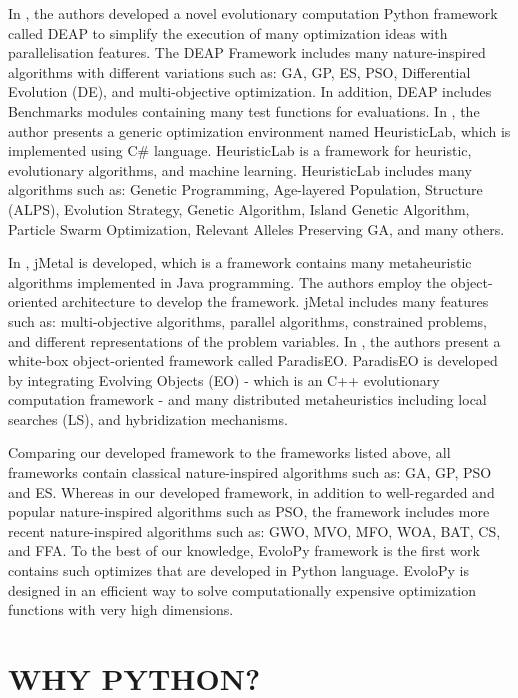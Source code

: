 \documentclass[a4paper,twoside]{article}
\begin{document}
In \cite {DEAP_JMLR2012}, the authors developed a novel evolutionary computation Python framework called DEAP to simplify the execution of many optimization ideas with  parallelisation features. The DEAP Framework includes many nature-inspired algorithms with different variations such as: GA, GP, ES, PSO, Differential Evolution (DE), and multi-objective optimization. In addition, DEAP includes Benchmarks modules containing many test functions for evaluations. In \cite{Wagner04}, the author presents a generic optimization environment named HeuristicLab, which is implemented using C\# language. HeuristicLab is a framework for heuristic, evolutionary algorithms, and machine learning. HeuristicLab includes many algorithms such as: Genetic Programming, Age-layered Population, Structure (ALPS), Evolution Strategy, Genetic Algorithm, Island Genetic Algorithm, Particle Swarm Optimization, Relevant Alleles Preserving GA, and many others. 

In \cite{Durillo2011}, jMetal is developed, which is a framework contains many metaheuristic algorithms implemented in Java programming. The authors employ the object-oriented architecture to develop the framework. jMetal includes many features such as: multi-objective algorithms, parallel algorithms, constrained problems, and different representations of the problem variables. In \cite{Cahon2004,humeau13}, the authors present a white-box object-oriented framework called ParadisEO. ParadisEO is developed by integrating Evolving Objects (EO) - which is an C++ evolutionary computation framework - and many distributed metaheuristics including local searches (LS), and hybridization mechanisms.  

Comparing our developed framework to the frameworks listed above, all frameworks contain classical nature-inspired algorithms such as: GA, GP, PSO and ES. Whereas in our developed framework, in addition to well-regarded and popular nature-inspired algorithms such as PSO, the framework includes more recent nature-inspired algorithms such as: GWO, MVO, MFO, WOA, BAT, CS, and FFA. To the best of our knowledge, EvoloPy framework is the first work contains such optimizes that are developed in Python language. EvoloPy is designed in an efficient way to solve computationally expensive optimization functions with very high dimensions.


\section{\uppercase{Why Python?}}
\end{document}
